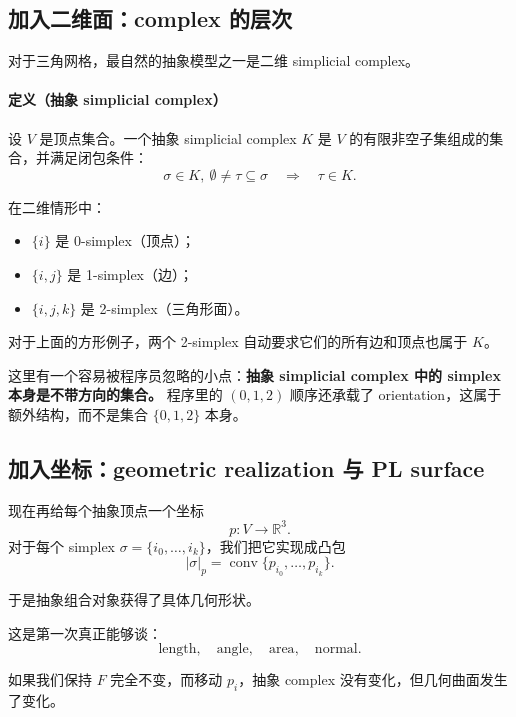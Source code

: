 \documentclass[UTF8,11pt]{ctexart}
\begin{document}
\subsection{加入二维面：complex 的层次}

对于三角网格，最自然的抽象模型之一是二维 simplicial complex。

\paragraph{定义（抽象 simplicial complex）}
设 $V$ 是顶点集合。一个抽象 simplicial complex $K$ 是 $V$ 的有限非空子集组成的集合，并满足闭包条件：
\[
\sigma\in K,\ \emptyset\neq \tau\subseteq\sigma
\quad\Longrightarrow\quad
\tau\in K.
\]

在二维情形中：
\begin{itemize}
  \item $\{i\}$ 是 0-simplex（顶点）；
  \item $\{i,j\}$ 是 1-simplex（边）；
  \item $\{i,j,k\}$ 是 2-simplex（三角形面）。
\end{itemize}

对于上面的方形例子，两个 2-simplex 自动要求它们的所有边和顶点也属于 $K$。

这里有一个容易被程序员忽略的小点：\textbf{抽象 simplicial complex 中的 simplex 本身是不带方向的集合。} 程序里的 $(0,1,2)$ 顺序还承载了 orientation，这属于额外结构，而不是集合 $\{0,1,2\}$ 本身。

\subsection{加入坐标：geometric realization 与 PL surface}

现在再给每个抽象顶点一个坐标
\[
p:V\to\mathbb R^3.
\]
对于每个 simplex $\sigma=\{i_0,\dots,i_k\}$，我们把它实现成凸包
\[
|\sigma|_p=\operatorname{conv}\{p_{i_0},\dots,p_{i_k}\}.
\]

于是抽象组合对象获得了具体几何形状。

这是第一次真正能够谈：
\[
\text{length},\quad \text{angle},\quad \text{area},\quad \text{normal}.
\]

如果我们保持 $F$ 完全不变，而移动 $p_i$，抽象 complex 没有变化，但几何曲面发生了变化。
\end{document}
